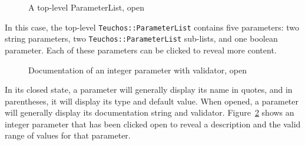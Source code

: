 \documentclass[pdf,ps2pdf,12pt]{smemo}
\begin{document}
\begin{memo}
\begin{figure}[h]
  \begin{centering}
    \caption{\label{fig:open_top} A top-level ParameterList, open}
  \end{centering}
\end{figure}

In this case, the top-level \texttt{Teuchos::ParameterList} contains
five parameters: two string parameters, two
\texttt{Teuchos::ParameterList} sub-lists, and one boolean parameter.
Each of these parameters can be clicked to reveal more content.

\begin{figure}[h]
  \begin{centering}
    \caption{\label{fig:open_integer} Documentation of an integer
      parameter with validator, open}
  \end{centering}
\end{figure}

In its closed state, a parameter will generally display its name in
quotes, and in parentheses, it will display its type and default
value.  When opened, a parameter will generally display its
documentation string and validator.  Figure~\ref{fig:open_integer}
shows an integer parameter that has been clicked open to reveal a
description and the valid range of values for that parameter.


\end{memo}
\end{document}

